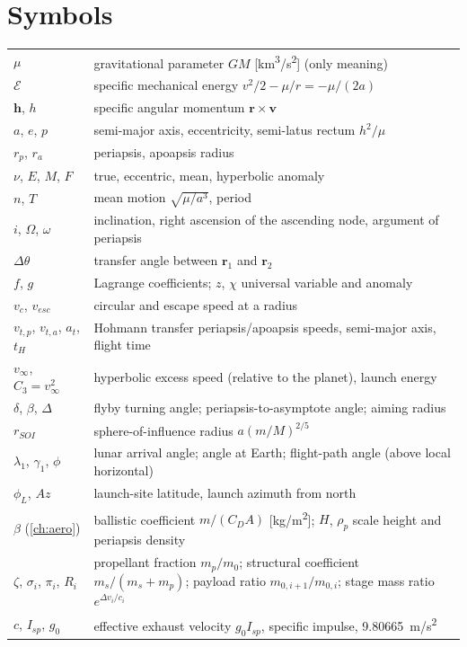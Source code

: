 \documentclass[11pt,letterpaper,oneside]{report}
\newcommand{\dv}{\Delta v}
\newcommand{\vinf}{v_\infty}
\newcommand{\En}{\mathcal E}
\newcommand{\Isp}{{I_{sp}}}
\newcommand{\gz}{g_0}
\newcommand{\bv}[1]{\bm{#1}}
\begin{document}
\chapter{Symbols}\label{app:symbols}
\begin{center}\small
\begin{tabular}{lp{}}\toprule
$\mu$ & gravitational parameter $GM$ [\si{km^3/s^2}] (only meaning) \\
$\En$ & specific mechanical energy $v^2/2-\mu/r=-\mu/(2a)$ \\
$\bv h$, $h$ & specific angular momentum $\bv r\times\bv v$ \\
$a$, $e$, $p$ & semi-major axis, eccentricity, semi-latus rectum $h^2/\mu$ \\
$r_p$, $r_a$ & periapsis, apoapsis radius \\
$\nu$, $E$, $M$, $F$ & true, eccentric, mean, hyperbolic anomaly \\
$n$, $T$ & mean motion $\sqrt{\mu/a^3}$, period \\
$i$, $\Omega$, $\omega$ & inclination, right ascension of the ascending node, argument of periapsis \\
$\Delta\theta$ & transfer angle between $\bv r_1$ and $\bv r_2$ \\
$f$, $g$ & Lagrange coefficients; $z$, $\chi$ universal variable and anomaly \\
$v_c$, $v_{esc}$ & circular and escape speed at a radius \\
$v_{t,p}$, $v_{t,a}$, $a_t$, $t_H$ & Hohmann transfer periapsis/apoapsis speeds, semi-major axis, flight time \\
$\vinf$, $C_3=\vinf^2$ & hyperbolic excess speed (relative to the planet), launch energy \\
$\delta$, $\beta$, $\Delta$ & flyby turning angle; periapsis-to-asymptote angle; aiming radius \\
$r_{SOI}$ & sphere-of-influence radius $a(m/M)^{2/5}$ \\
$\lambda_1$, $\gamma_1$, $\phi$ & lunar arrival angle; angle at Earth; flight-path angle (above local horizontal) \\
$\phi_L$, $Az$ & launch-site latitude, launch azimuth from north \\
$\beta$ (\cref{ch:aero}) & ballistic coefficient $m/(C_DA)$ [\si{kg/m^2}]; $H$, $\rho_p$ scale height and periapsis density \\
$\zeta$, $\sigma_i$, $\pi_i$, $R_i$ & propellant fraction $m_p/m_0$; structural coefficient $m_s/(m_s+m_p)$; payload ratio $m_{0,i+1}/m_{0,i}$; stage mass ratio $e^{\dv_i/c_i}$ \\
$c$, $\Isp$, $\gz$ & effective exhaust velocity $\gz\Isp$, specific impulse, \SI{9.80665}{m/s^2} \\\bottomrule
\end{tabular}
\end{center}
\end{document}

